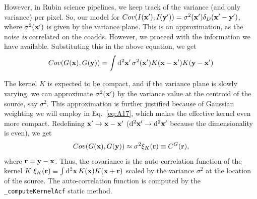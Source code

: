 \documentclass[DM,lsstdraft, authoryear,toc]{lsstdoc}
\newcommand{\rmd}{\mathrm{d}^2}
\begin{document}
However, in Rubin science pipelines, we keep track of the variance (and only variance) per pixel.
So, our model for $Cov(I({\bf x}'), I({\bf y}')) = \sigma^2({\bf x}')\delta_D({\bf x'}-{\bf y}')$, where $\sigma^2({\bf x}')$ is given by the variance plane.
This is an approximation, as the noise \emph{is} correlated on the coadds. However, we proceed with the information we have available. Substituting this in the above equation, we get
\begin{equation}
  Cov(G({\bf x}), G({\bf y})) = \int\rmd{\bf x}'\, \sigma^2({\bf x}') K({\bf x}-{\bf x}')K({\bf y}-{\bf x}')
\end{equation}

The kernel $K$ is expected to be compact, and if the variance plane is slowly varying, we can approximate $\sigma^2({\bf x}')$ by the variance value at the centroid of the source, say $\sigma^2$. This approximation is further justified because of Gaussian weighting we will employ in Eq.~\ref{eq:A17}, which makes the effective kernel even more compact. Redefining ${\bf x}' \rightarrow {\bf x} - {\bf x}'$ ($\rmd{\bf x}' \rightarrow \rmd{\bf x}'$ because the dimensionality is even), we get
\begin{equation}
  Cov(G({\bf x}), G({\bf y})) \approx \sigma^2 \xi_K({\bf r}) \equiv C^G({\bf r}),
\end{equation}
where ${\bf r} = {\bf y}-{\bf x}$. Thus, the covariance is the auto-correlation function of the kernel $K$ $\xi_K({\bf r}) \equiv \int\rmd{\bf x}\, K({\bf x})K({\bf x}+{\bf r})$  scaled by the variance $\sigma^2$ at the location of the source. The auto-correlation function is computed by the \texttt{\_computeKernelAcf} static method.
\end{document}
